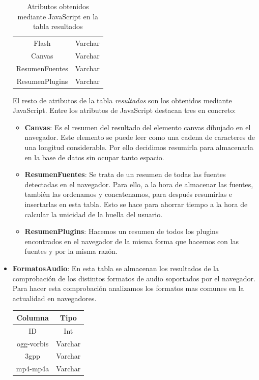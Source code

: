 \begin{itemize}
\begin{table}[H]
\begin{tabular}{c|c}
            Flash & Varchar\\
            Canvas & Varchar\\
            ResumenFuentes & Varchar\\
            ResumenPlugins & Varchar\\
        \end{tabular}
        \caption{Atributos obtenidos mediante JavaScript en la tabla resultados}
        \label{tab:resultadosJavascript}
    \end{table}
    El resto de atributos de la tabla \textit{resultados} son los obtenidos mediante JavaScript. Entre los atributos de JavaScript destacan tres en concreto:
    \begin{itemize}
        \item \textbf{Canvas}: Es el resumen del resultado del elemento canvas dibujado en el navegador. Este elemento se puede leer como una cadena de caracteres de una longitud considerable. Por ello decidimos resumirla para almacenarla en la base de datos sin ocupar tanto espacio.
        \item \textbf{ResumenFuentes}: Se trata de un resumen de todas las fuentes detectadas en el navegador. Para ello, a la hora de almacenar las fuentes, también las ordenamos y concatenamos, para después resumirlas e insertarlas en esta tabla. Esto se hace para ahorrar tiempo a la hora de calcular la unicidad de la huella del usuario.
        \item \textbf{ResumenPlugins}: Hacemos un resumen de todos los plugins encontrados en el navegador de la misma forma que hacemos con las fuentes y por la misma razón.
    \end{itemize}
    \item \textbf{FormatosAudio}: En esta tabla se almacenan los resultados de la comprobación de los distintos formatos de audio soportados por el navegador. Para hacer esta comprobación analizamos los formatos mas comunes en la actualidad en navegadores.\cite{Formatos} \par
    \begin{table}[H]
        \centering
        \begin{tabular}{c|c}
            Columna & Tipo \\ \hline
            ID & Int\\
            ogg-vorbis & Varchar\\
            3gpp & Varchar\\
            mp4-mp4a & Varchar\\

\end{tabular}
\end{table}
\end{itemize}
